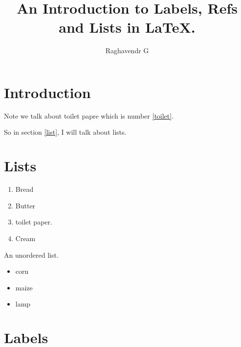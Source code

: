 \documentclass{article}
\author{Raghavendr G}
\title{An Introduction to Labels, Refs and Lists in {\LaTeX}.}
\begin{document}
\maketitle

\section{Introduction}

Note we talk about toilet papre which is number \ref{toilet}.

So in section \ref{list}, I will talk about lists.

\section{Lists\label{list}}

\begin{enumerate}
\item Bread
\item Butter
\item toilet paper\label{toilet}.
\item Cream
\end{enumerate}

An unordered list.

\begin{itemize}
\item corn
\item maize
\item lamp
\end{itemize}

\section{Labels}
\end{document}
